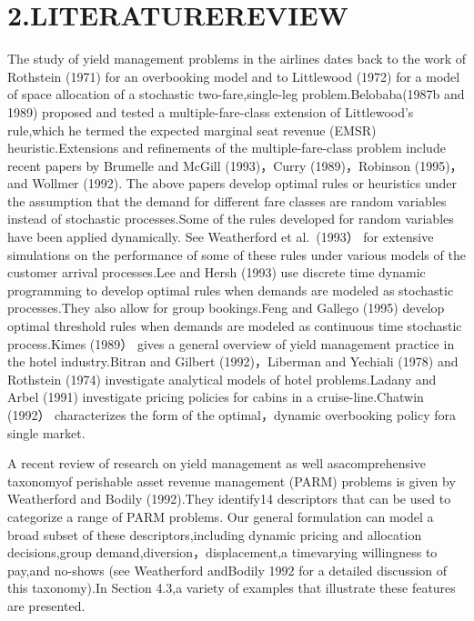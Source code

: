\section{2.LITERATUREREVIEW}\label{literaturereview}

The study of yield management problems in the airlines dates back to the
work of Rothstein (1971) for an overbooking model and to Littlewood
(1972) for a model of space allocation of a stochastic
two-fare,single-leg problem.Belobaba(1987b and 1989) proposed and tested
a multiple-fare-class extension of Littlewood's rule,which he termed the
expected marginal seat revenue (EMSR) heuristic.Extensions and
refinements of the multiple-fare-class problem include recent papers by
Brumelle and McGill (1993)，Curry (1989)，Robinson (1995)，and Wollmer
(1992). The above papers develop optimal rules or heuristics under the
assumption that the demand for different fare classes are random
variables instead of stochastic processes.Some of the rules developed
for random variables have been applied dynamically. See Weatherford et
al.~(1993） for extensive simulations on the performance of some of
these rules under various models of the customer arrival processes.Lee
and Hersh (1993) use discrete time dynamic programming to develop
optimal rules when demands are modeled as stochastic processes.They also
allow for group bookings.Feng and Gallego (1995) develop optimal
threshold rules when demands are modeled as continuous time stochastic
process.Kimes (1989） gives a general overview of yield management
practice in the hotel industry.Bitran and Gilbert (1992)，Liberman and
Yechiali (1978) and Rothstein (1974) investigate analytical models of
hotel problems.Ladany and Arbel (1991) investigate pricing policies for
cabins in a cruise-line.Chatwin (1992） characterizes the form of the
optimal，dynamic overbooking policy fora single market.

A recent review of research on yield management as well asacomprehensive
taxonomyof perishable asset revenue management (PARM) problems is given
by Weatherford and Bodily (1992).They identify14 descriptors that can be
used to categorize a range of PARM problems. Our general formulation can
model a broad subset of these descriptors,including dynamic pricing and
allocation decisions,group demand,diversion，displacement,a timevarying
willingness to pay,and no-shows (see Weatherford andBodily 1992 for a
detailed discussion of this taxonomy).In Section 4.3,a variety of
examples that illustrate these features are presented.

